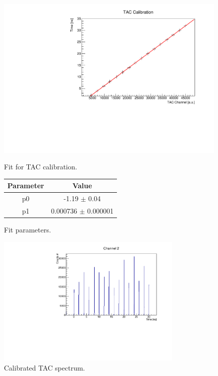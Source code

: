 \documentclass[a4paper,11pt]{article}
\begin{document}
\begin{figure}[h!]
\begin{minipage}[b]{0.6\textwidth}
\centering
\includegraphics[width=\textwidth]{fit_calibrazione_tac}
\caption{Fit for TAC calibration.}
\label{fig: fit tac}
\end{minipage}
\hfill
\begin{minipage}[b]{0.45\textwidth}
\centering
\begin{tabular}{cc}
\toprule
\toprule
Parameter & Value \\
\midrule
p0     & -1.19 $\pm$  0.04 \\
p1     &  0.000736   $\pm$  0.000001\\
\bottomrule
\bottomrule
\end{tabular}
\vspace{1.5cm}
\caption*{Fit parameters.}
\end{minipage}

\end{figure}

\begin{figure}[h!]
\centering
\includegraphics[width=0.8\textwidth]{tac_calibrato}
\caption{Calibrated TAC spectrum. }
\label{fig: calibrated TAC}
\end{figure}
\clearpage
\end{document}
